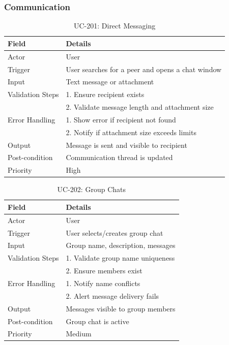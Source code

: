 \subsubsection{Communication}
\begin{table}[H]
\centering
\caption{UC-201: Direct Messaging}
\begin{tabular}{|l|p{10cm}|}
\hline
\textbf{Field} & \textbf{Details} \\ \hline
Actor & User \\ \hline
Trigger & User searches for a peer and opens a chat window \\ \hline
Input & Text message or attachment \\ \hline
Validation Steps & 1. Ensure recipient exists \\ 
                 & 2. Validate message length and attachment size \\ \hline
Error Handling & 1. Show error if recipient not found \\ 
               & 2. Notify if attachment size exceeds limits \\ \hline
Output & Message is sent and visible to recipient \\ \hline
Post-condition & Communication thread is updated \\ \hline
Priority & High \\ \hline
\end{tabular}
\end{table}

\begin{table}[H]
\centering
\caption{UC-202: Group Chats}
\begin{tabular}{|l|p{10cm}|}
\hline
\textbf{Field} & \textbf{Details} \\ \hline
Actor & User \\ \hline
Trigger & User selects/creates group chat \\ \hline
Input & Group name, description, messages \\ \hline
Validation Steps & 1. Validate group name uniqueness \\ 
                 & 2. Ensure members exist \\ \hline
Error Handling & 1. Notify name conflicts \\ 
               & 2. Alert message delivery fails \\ \hline
Output & Messages visible to group members \\ \hline
Post-condition & Group chat is active \\ \hline
Priority & Medium \\ \hline
\end{tabular}
\end{table}

